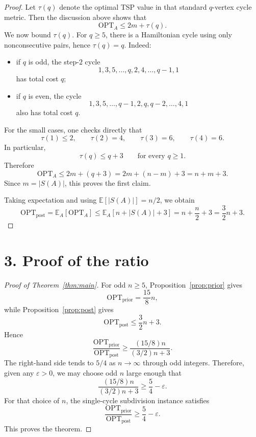 \documentclass[11pt]{amsart}
\newcommand{\E}{\mathbb{E}}
\newcommand{\optprior}{\mathrm{OPT}_{\mathrm{prior}}}
\newcommand{\optpost}{\mathrm{OPT}_{\mathrm{post}}}
\begin{document}
\begin{proof}
Let $\tau(q)$ denote the optimal TSP value in that standard $q$-vertex cycle metric. Then the discussion above shows that
\[
\mathrm{OPT}_A\le 2m+\tau(q).
\]
We now bound $\tau(q)$. For $q\ge 5$, there is a Hamiltonian cycle using only nonconsecutive pairs, hence $\tau(q)=q$. Indeed:
\begin{itemize}[leftmargin=2em]
    \item if $q$ is odd, the step-$2$ cycle
    \[
    1,3,5,\dots,q,2,4,\dots,q-1,1
    \]
    has total cost $q$;
    \item if $q$ is even, the cycle
    \[
    1,3,5,\dots,q-1,2,q,q-2,\dots,4,1
    \]
    also has total cost $q$.
\end{itemize}
For the small cases, one checks directly that
\[
\tau(1)\le 2,\qquad \tau(2)=4,\qquad \tau(3)=6,\qquad \tau(4)=6.
\]
In particular,
\[
\tau(q)\le q+3 \qquad \text{for every } q\ge 1.
\]
Therefore
\[
\mathrm{OPT}_A\le 2m+(q+3)=2m+(n-m)+3=n+m+3.
\]
Since $m=|S(A)|$, this proves the first claim.

Taking expectation and using $\E[|S(A)|]=n/2$, we obtain
\[
\optpost
=\E_A[\mathrm{OPT}_A]
\le
\E_A[n+|S(A)|+3]
=
 n+\frac n2+3
=
\frac32 n+3.
\]
\end{proof}

\section*{3. Proof of the ratio}

\begin{proof}[Proof of Theorem~\ref{thm:main}]
For odd $n\ge 5$, Proposition~\ref{prop:prior} gives
\[
\optprior=\frac{15}{8}n,
\]
while Proposition~\ref{prop:post} gives
\[
\optpost\le \frac32 n+3.
\]
Hence
\[
\frac{\optprior}{\optpost}
\ge
\frac{(15/8)n}{(3/2)n+3}.
\]
The right-hand side tends to $5/4$ as $n\to\infty$ through odd integers. Therefore, given any $\varepsilon>0$, we may choose odd $n$ large enough that
\[
\frac{(15/8)n}{(3/2)n+3}\ge \frac54-\varepsilon.
\]
For that choice of $n$, the single-cycle subdivision instance satisfies
\[
\frac{\optprior}{\optpost}\ge \frac54-\varepsilon.
\]
This proves the theorem.
\end{proof}
\end{document}
